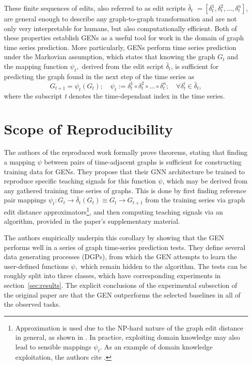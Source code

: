 These finite sequences of edits, also referred to as edit scripts $\bar{\delta}_{t}$ $= [\delta^{1}_{t}, \delta^{2}_{t}, \dots, \delta^{n}_{t}]$, are general enough to describe any graph-to-graph transformation and are not only very interpretable for humans, but also computationally efficient. Both of these properties establish GENs as a useful tool for work in the domain of graph time series prediction. More particularly, GENs perform time series prediction under the Markovian assumption, which states that knowing the graph $G_{t}$ and the mapping function $\psi_{t},$ derived from the edit script $\bar{\delta}_{t}$, is sufficient for predicting the graph found in the next step of the time series as 
\begin{equation*}
    G_{t+1} = \psi_{t}(G_{t}); \quad \psi_{t} := \delta^{1}_{t} \circ \delta^{2}_{t} \circ \dots \circ \delta^{n}_{t}; \quad \forall \delta^{i}_{t} \in \bar{\delta}_{t},
\end{equation*} where the subscript \textit{t} denotes the time-dependant index in the time series.
\section{Scope of Reproducibility}
\label{sec:claims}

The authors of the reproduced work formally prove theorems, stating that finding a mapping $\psi$ between pairs of time-adjacent graphs is sufficient for constructing training data for GENs. 
They propose that their GNN architecture be trained to reproduce specific teaching signals for this function $\psi$, which may be derived from any gathered training time series of graphs. 
This is done by first finding reference pair mappings $\psi_{t}: G_{t} \to \bar{\delta}_{t}(G_{t}) \equiv G_{t} \to G_{t+1}$ from the training series via graph edit distance approximators\footnote{Approximation is used due to the NP-hard nature of the graph edit distance in general, as shown in \cite{bougleux2017graph}. In practice, exploiting domain knowledge may also lead to sensible mappings $\psi_{t}$. As an example of domain knowledge exploitation, the authors cite \cite{zhang1989simple}.}, and then computing teaching signals via an algorithm, provided in the paper's supplementary material. 

The authors empirically underpin this corollary by showing that the GEN performs well in a series of graph time-series prediction tests. They define several data generating processes (DGPs), from which the GEN attempts to learn the user-defined functions $\psi,$ which remain hidden to the algorithm. The tests can be roughly split into three classes, which have corresponding experiments in section~\ref{sec:results}. The explicit conclusions of the experimental subsection of the original paper are that the GEN outperforms the selected baselines in all of the observed tasks. 

